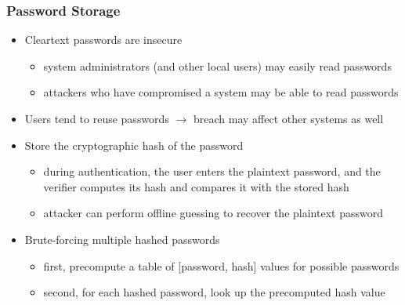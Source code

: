 \documentclass[final]{article}
\begin{document}
\subsubsection*{Password Storage}
\begin{itemize}[nosep]
    \item Cleartext passwords are insecure
          \begin{itemize}[nosep]
              \item system administrators (and other local users) may easily read passwords
              \item attackers who have compromised a system may be able to read passwords
          \end{itemize}
    \item Users tend to reuse passwords $\rightarrow$ breach may affect other systems as well
    \item Store the cryptographic hash of the password
          \begin{itemize}[nosep]
              \item during authentication, the user enters the plaintext password, and the verifier computes its hash and compares it with the stored hash
              \item attacker can perform offline guessing to recover the plaintext password
          \end{itemize}
    \item Brute-forcing multiple hashed passwords
          \begin{itemize}[nosep]
              \item first, precompute a table of [password, hash] values for possible passwords
              \item second, for each hashed password, look up the precomputed hash value
          \end{itemize}
\end{itemize}
\end{document}

